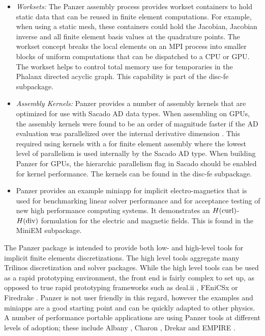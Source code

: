 \begin{itemize}
\item \emph{Worksets:} The Panzer assembly process provides workset containers to hold static data that can be reused in finite element computations. For example, when using a static mesh, these containers could hold the Jacobian, Jacobian inverse and all finite element basis values at the quadrature points. The workset concept breaks the local elements on an MPI process into smaller blocks of uniform computations that can be dispatched to a CPU or GPU. The workset helps to control total memory use for temporaries in the Phalanx directed acyclic graph. This capability is part of the disc-fe subpackage.
\item \emph{Assembly Kernels:} Panzer provides a number of assembly kernels that are optimized for use with Sacado AD data types. When assembling on GPUs, the assembly kernels were found to be an order of magnitude faster if the AD evaluation was parallelized over the internal derivative dimension \cite{phipps2022automatic}. This required using kernels with a  for finite element assembly where the lowest level of parallelism is used internally by the Sacado AD type. When building Panzer for GPUs, the  hierarchic parallelism flag in Sacado should be enabled for kernel performance. The kernels can be found in the disc-fe subpackage. 
\item Panzer provides an example miniapp for implicit electro-magnetics that is used for benchmarking linear solver performance and for acceptance testing of new high performance computing systems. It demonstrates an $H(\rm{curl})$-$H(\rm{div})$ formulation for the electric and magnetic fields. This is found in the MiniEM subpackage.
\end{itemize}

The Panzer package is intended to provide both low- and high-level tools for implicit finite elements discretizations. The high level tools aggregate many Trilinos discretization and solver packages. While the high level tools can be used as a rapid prototyping environment, the front end is fairly complex to set up, as opposed to true rapid prototyping frameworks such as deal.ii \cite{dealII95}, FEniCSx \cite{BarattaEtal2023} or Firedrake \cite{FiredrakeUserManual}. Panzer is not user friendly in this regard, however the examples and miniapps are a good starting point and can be quickly adapted to other physics. A number of performance portable applications are using Panzer tools at different levels of adoption; these include Albany \cite{Salinger2016}, Charon \cite{CharonUsersManual2020}, Drekar \cite{Crockatt2022,Miller2019,Shadid2016mhd} and EMPIRE \cite{BettencourtBrownEtAl2021_EmpirePic}.

